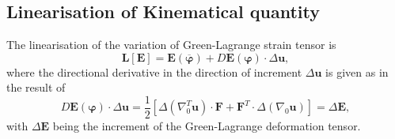 \subsection{Linearisation of Kinematical quantity}
The linearisation of the variation of Green-Lagrange strain tensor is 
\begin{equation}
\mathbf{L}\left[ \mathbf{E} \right] = \mathbf{E}(\overline{\bm{\varphi}}) + D \mathbf{E}(\bm{\varphi}) \cdot \Delta \mathbf{u},
\label{eq:2.17}
\end{equation}
where the directional derivative in the direction of increment $\Delta \mathbf{u}$ is given as in the result of 
\begin{equation}
D \mathbf{E}(\bm{\varphi}) \cdot \Delta\mathbf{u} = \dfrac{1}{2} \left[ \Delta(\nabla_0^T \mathbf{u}) \cdot \mathbf{F} + \mathbf{F}^T \cdot \Delta(\nabla_0 \mathbf{u}) \right] = \Delta \mathbf{E},
\label{eq:2.18}
\end{equation}
with $\Delta\mathbf{E}$ being the increment of the Green-Lagrange deformation tensor.
